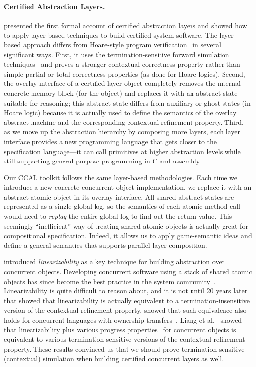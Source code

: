 

\paragraph{Certified Abstraction Layers.} \citet{dscal15}
presented the first formal account of certified abstraction layers and
showed how to apply layer-based techniques to build certified system
software. The layer-based approach differs from Hoare-style program
verification~\cite{hoare69,reynolds02,boogie05,nanevski06} in several
significant ways. First, it uses the termination-sensitive forward
simulation techniques~\cite{Lynch95,compcert} and proves a stronger
contextual correctness property rather than simple partial or total
correctness properties (as done for Hoare logics).
Second, the overlay interface of a certified layer object completely
removes the internal concrete memory block (for the object) and
replaces it with an abstract state suitable for reasoning; this
abstract state differs from auxiliary or ghost states (in Hoare
logic) because it is actually used to define the semantics of the
overlay abstract machine and the corresponding contextual refinement
property.
Third, as we move up the abstraction hierarchy by composing more
layers, each layer interface provides a new programming language that gets
closer to the specification language---it can call primitives at
higher abstraction levels while still supporting general-purpose
programming in C and assembly.

Our CCAL toolkit follows the same layer-based methodologies. Each time
we introduce a new concrete concurrent object implementation, we
replace it with an abstract atomic object in its overlay
interface. All shared abstract states are represented as a single
global log, so the semantics of each atomic method call would need to
{\em replay} the entire global log to find out the return value.  This
seemingly ``inefficient'' way of treating shared atomic objects is
actually great for compositional specification. Indeed, it allows us
to apply game-semantic ideas and define a general semantics that
supports parallel layer composition.

\citet{herlihy90} introduced {\em linearizability} as a key technique
for building abstraction over concurrent objects. Developing
concurrent software using a stack of shared atomic objects has since
become the best practice in the system
community~\cite{Herlihy08book,ospp11}. Linearizability is quite
difficult to reason about, and it is not until 20 years later that
\citet{filipovic10} showed that linearizability is actually equivalent
to a termination-insensitive version of the contextual refinement
property. \citet{Gotsman12concur} showed that such equivalence also
holds for concurrent languages with ownership
transfers~\cite{ohearn:concur04}.  Liang et al.~\cite{liang13,lili16} showed that linearizability plus various
progress properties~\cite{Herlihy08book} for concurrent objects is
equivalent to various termination-sensitive versions of the contextual
refinement property. These results convinced us that we should prove
termination-sensitive (contextual) simulation when building certified
concurrent layers as well.

